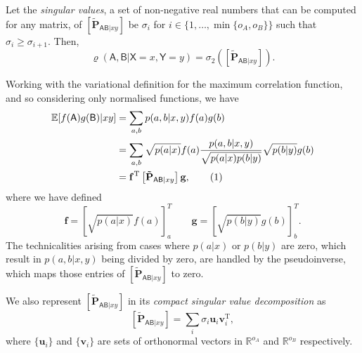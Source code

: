 \documentclass[10pt, a4paper]{article}
\numberwithin{equation}{section} %
\theoremstyle{definition}
\theoremstyle{plain}
\newcommand{\usenumber}{%
  \refstepcounter{equation}\tag{\theequation}
}
\newcommand{\dintv}[2]{\mathopen\{#1,\ldots,#2\mathclose\}}
\newcommand{\?}{\mathrel{?}} %
\newcommand{\R}{\mathbb{R}} %
\newcommand{\tpose}{\mathrm{T}}
\newcommand{\cvec}[1]{\boldsymbol{\mathbf{#1}}}    %
\newcommand{\rvec}[1]{\boldsymbol{\mathbf{#1}}^\tpose} %
\newcommand{\matr}[2][]{\left[\mathbf{#2}#1\right]} %
\newcommand{\E}{\mathbb{E}} %
\newcommand{\crv}[1]{\mathsf{#1}}
\begin{document}
                        Let the \emph{singular values}, a set of non-negative real numbers that can be computed for any matrix, of \(\matr[_{\crv{AB}|xy}]{\tilde{P}}\) be \(\sigma_i\) for \(i \in \dintv{1}{\min\{o_A, o_B\}}\) such that \(\sigma_{i} \geq \sigma_{i+1}\). Then,
                        \begin{equation}
                          \varrho(\crv{A},\crv{B}|\crv{X}=x,\crv{Y}=y) = \sigma_2\left( \matr[_{\crv{AB}|xy}]{\tilde{P}} \right).
                        \end{equation}

                        Working with the variational definition for the maximum correlation function, and so considering only normalised functions, we have
                        \begin{align*}
                          \E[f(\crv{A})g(\crv{B})|xy] &= \sum_{a,b} p(a,b|x,y) f(a)g(b) \\
                                                      &= \sum_{a,b} \sqrt{p(a|x)} f(a) \frac{p(a,b|x,y)}{\sqrt{p(a|x)p(b|y)}} \sqrt{p(b|y)} g(b) \\
                                                      &= \rvec{f} \matr[_{\crv{AB}|xy}]{\tilde{P}} \cvec{g}, \usenumber
                        \end{align*}
                        where we have defined
                        \begin{equation}
                          \cvec{f} = {[\sqrt{p(a|x)} f(a)]}^T_a \qquad \cvec{g} = {[\sqrt{p(b|y)} g(b)]}^T_b.
                        \end{equation}
                        The technicalities arising from cases where \(p(a|x)\) or \(p(b|y)\) are zero, which result in \(p(a,b|x,y)\) being divided by zero, are handled by the pseudoinverse, which maps those entries of \(\matr[_{\crv{AB}|xy}]{\tilde{P}}\) to zero.

                        We also represent \(\matr[_{\crv{AB}|xy}]{\tilde{P}}\) in its \emph{compact singular value decomposition} as
                        \begin{equation}
                          \matr[_{\crv{AB}|xy}]{\tilde{P}} = \sum_i \sigma_i \cvec{u}_i \rvec{v}_i,
                        \end{equation}
                        where \(\{\cvec{u}_i\}\) and \(\{\cvec{v}_i\}\) are sets of orthonormal vectors in \(\R^{o_A}\) and \(\R^{o_B}\) respectively.
\end{document}
